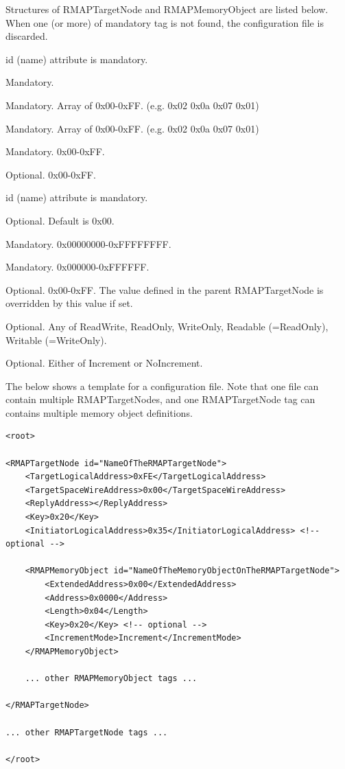 \documentclass[a4paper,10pt]{article}
\begin{document}
Structures of RMAPTargetNode and RMAPMemoryObject are listed below. When one (or more) of mandatory tag is not found, the configuration file is discarded.
\begin{description}
  \setlength{\parskip}{0cm}
  \setlength{\itemsep}{0cm}
\item[RMAPTargetNode] id (name) attribute is mandatory.
	\begin{description}
	  \setlength{\parskip}{0cm}
	  \setlength{\itemsep}{0cm}
	  \item[TargetLogicalAddress] Mandatory.
	  \item[TargetSpaceWireAddress] Mandatory. Array of 0x00-0xFF. (e.g.  0x02 0x0a 0x07 0x01)
	  \item[ReplyAddress] Mandatory. Array of 0x00-0xFF. (e.g.  0x02 0x0a 0x07 0x01)
	  \item[Key] Mandatory. 0x00-0xFF.
	  \item[InitiatorLogicalAddress] Optional. 0x00-0xFF.
	\end{description}	  
\item[RMAPMemoryObject] id (name) attribute is mandatory.
	\begin{description}
	  \setlength{\parskip}{0cm}
	  \setlength{\itemsep}{0cm}
	  \item[ExtendedAddress] Optional. Default is 0x00.
	  \item[Address] Mandatory. 0x00000000-0xFFFFFFFF.
	  \item[Length] Mandatory. 0x000000-0xFFFFFF.
	  \item[Key] Optional. 0x00-0xFF. The value defined in the parent RMAPTargetNode is overridden by this value if set.
	  \item[AccessMode] Optional. Any of ReadWrite, ReadOnly, WriteOnly, Readable (=ReadOnly), Writable (=WriteOnly).
	  \item[IncrementMode] Optional. Either of Increment or NoIncrement.
	\end{description}	  
\end{description}
The below shows a template for a configuration file.
Note that one file can contain multiple RMAPTargetNodes, and one RMAPTargetNode tag can contains multiple memory object definitions.
\begin{lstlisting}[label=source:xml_configurationfile_template, caption=Tags which define RMAPTargetNode and RMAPMemoryObject.]
<root>

<RMAPTargetNode id="NameOfTheRMAPTargetNode">
	<TargetLogicalAddress>0xFE</TargetLogicalAddress>
	<TargetSpaceWireAddress>0x00</TargetSpaceWireAddress>
	<ReplyAddress></ReplyAddress>
	<Key>0x20</Key>
	<InitiatorLogicalAddress>0x35</InitiatorLogicalAddress>	<!-- optional -->
	
	<RMAPMemoryObject id="NameOfTheMemoryObjectOnTheRMAPTargetNode">
		<ExtendedAddress>0x00</ExtendedAddress>
		<Address>0x0000</Address>
		<Length>0x04</Length>
		<Key>0x20</Key>	<!-- optional -->
		<IncrementMode>Increment</IncrementMode>
	</RMAPMemoryObject>
	
	... other RMAPMemoryObject tags ...

</RMAPTargetNode>

... other RMAPTargetNode tags ...

</root>
\end{lstlisting}
\end{document}
